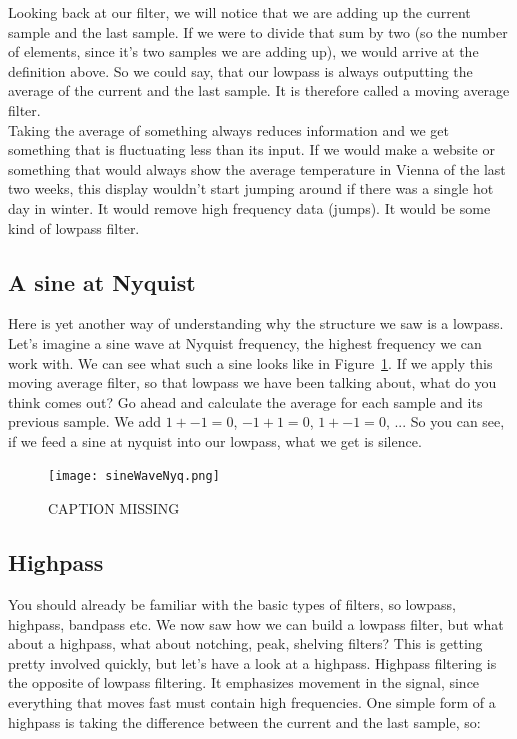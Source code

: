 Looking back at our filter, we will notice that we are adding up the current sample and the last sample. If we were to divide that sum by two (so the number of elements, since it's two samples we are adding up), we would arrive at the definition above. So we could say, that our lowpass is always outputting the average of the current and the last sample. It is therefore called a moving average filter. \\
Taking the average of something always reduces information and we get something that is fluctuating less than its input. If we would make a website or something that would always show the average temperature in Vienna of the last two weeks, this display wouldn't start jumping around if there was a single hot day in winter. It would remove high frequency data (jumps). It would be some kind of lowpass filter.


\subsection{A sine at Nyquist}
Here is yet another way of understanding why the structure we saw is a lowpass. Let's imagine a sine wave at Nyquist frequency, the highest frequency we can work with. We can see what such a sine looks like in Figure~\ref{fig:nyqSine}. If we apply this moving average filter, so that lowpass we have been talking about, what do you think comes out? Go ahead and calculate the average for each sample and its previous sample. We add $1 + -1 = 0$, $-1 + 1 = 0$, $1 + -1 = 0$, ... So you can see, if we feed a sine at nyquist into our lowpass, what we get is silence. 


\begin{figure}[H]
	\centering
	\texttt{[image: sineWaveNyq.png]}
	\caption[shortCaption]
	{CAPTION MISSING}
	\label{fig:nyqSine}
\end{figure}


\subsection{Highpass} %
\label{sub:Highpass}

You should already be familiar with the basic types of filters, so lowpass, highpass, bandpass etc. We now saw how we can build a lowpass filter, but what about a highpass, what about notching, peak, shelving filters? This is getting pretty involved quickly, but let's have a look at a highpass. Highpass filtering is the opposite of lowpass filtering. It emphasizes movement in the signal, since everything that moves fast must contain high frequencies. One simple form of a highpass is taking the difference between the current and the last sample, so:


